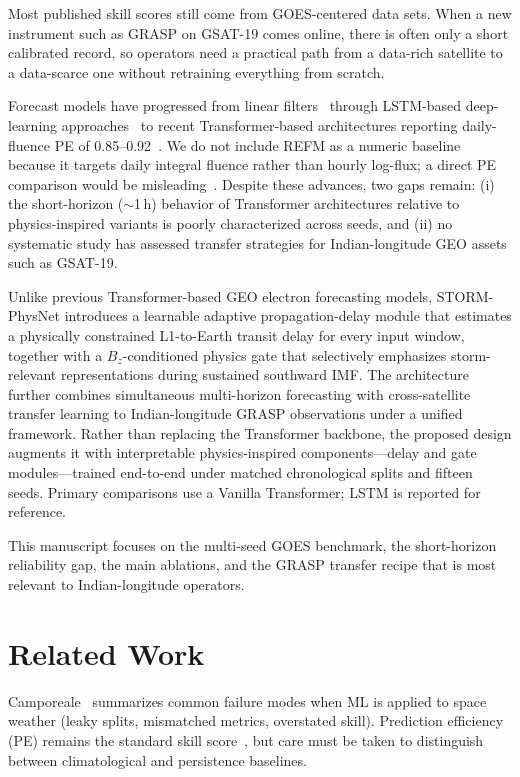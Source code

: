 \documentclass[conference]{IEEEtran}
\begin{document}
Most published skill scores still come from GOES-centered data sets. When a
new instrument such as GRASP on GSAT-19 comes online, there is often only a
short calibrated record, so operators need a practical path from a data-rich
satellite to a data-scarce one without retraining everything from scratch.

Forecast models have progressed from linear filters~\cite{b3,b4}
through LSTM-based deep-learning approaches~\cite{b5,b6,b7}
to recent Transformer-based architectures reporting daily-fluence PE of
0.85--0.92~\cite{b8,b9,b10}. We do not include REFM as a numeric baseline because it targets daily integral
fluence rather than hourly log-flux; a direct PE comparison would be
misleading~\cite{b4}. Despite these advances,
two gaps remain: (i) the short-horizon (\(\sim\)1\,h) behavior of
Transformer architectures relative to physics-inspired variants is poorly
characterized across seeds, and (ii) no systematic study has assessed
transfer strategies for Indian-longitude GEO assets such as GSAT-19.

Unlike previous Transformer-based GEO electron forecasting models,
STORM-PhysNet introduces a learnable adaptive propagation-delay module
that estimates a physically constrained L1-to-Earth transit delay for
every input window, together with a $B_z$-conditioned physics gate that
selectively emphasizes storm-relevant representations during sustained
southward IMF. The architecture further combines simultaneous
multi-horizon forecasting with cross-satellite transfer learning to
Indian-longitude GRASP observations under a unified framework. Rather
than replacing the Transformer backbone, the proposed design augments
it with interpretable physics-inspired components---delay and gate modules---trained end-to-end under matched chronological splits and fifteen seeds. Primary
comparisons use a Vanilla Transformer; LSTM is reported for
reference.

This manuscript focuses on the multi-seed GOES benchmark, the
short-horizon reliability gap, the main ablations, and the GRASP transfer
recipe that is most relevant to Indian-longitude operators.

\section{Related Work}
Camporeale~\cite{b11} summarizes common failure modes when ML is
applied to space weather (leaky splits, mismatched metrics, overstated skill).
Prediction efficiency (PE) remains the standard skill score~\cite{b12}, but care must be taken to distinguish between climatological and persistence baselines.
\end{document}
